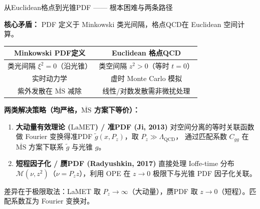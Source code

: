 \documentclass[10pt,aspectratio=169]{beamer}
\newcommand{\msbar}{\overline{\mathrm{MS}}}
\newcommand{\lqcd}{\Lambda_{\mathrm{QCD}}}
\newcommand{\LaMET}{\mathrm{LaMET}}
\begin{document}
\begin{frame}{从Euclidean格点到光锥PDF —— 根本困难与两条路径}

  \textbf{核心矛盾：} PDF 定义于 Minkowski 类光间隔，格点QCD在 Euclidean 空间计算。

  \begin{center}
  \begin{tabular}{c|c}
    \hline
    \textbf{Minkowski PDF定义} & \textbf{Euclidean 格点QCD} \\
    \hline
    类光间隔 $\xi^2 = 0$（沿光锥） & 类空间隔 $z^2 > 0$（等时 $t=0$）\\
    实时动力学 & 虚时 Monte Carlo 模拟 \\
    紫外发散在 $\msbar$ 减除 & 线性/对数发散需非微扰处理 \\
    \hline
  \end{tabular}
  \end{center}

  \vspace{4pt}
  \textbf{两类解决策略（均严格，$\msbar$ 方案下等价）：}

  \begin{enumerate}
    \item \textbf{大动量有效理论 ($\LaMET$) / 准PDF (Ji, 2013)}
    对空间分离的等时关联函数做 Fourier 变换得准PDF $\tilde{g}(x, P_z)$，取 $P_z \gg \lqcd$，
    通过匹配系数 $C_{gg}$ 在 $\msbar$ 方案下联系 $\tilde{g}$ 与光锥 $g$。

    \item \textbf{短程因子化 / 赝PDF (Radyushkin, 2017)}
    直接处理 Ioffe-time 分布 $\mathcal{M}(\nu, z^2)$（$\nu = P_z z$），利用 OPE 在 $z \to 0$ 极限下与光锥 PDF 因子化关联。
  \end{enumerate}

  差异在于极限取法：LaMET 取 $P_z \to \infty$（大动量），赝PDF 取 $z \to 0$（短程）。匹配系数互为 Fourier 变换对。
\end{frame}
\end{document}
